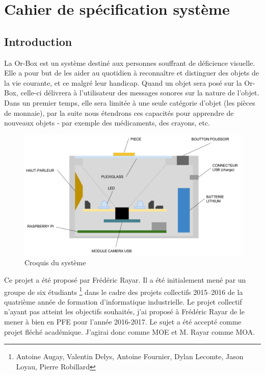 \chapter{Cahier de spécification système}

\section{Introduction}
\label{sec:intro}

La Or-Box est un système destiné aux personnes souffrant de déficience visuelle.
Elle a pour but de les aider au quotidien à reconnaître et distinguer des objets de la vie courante, et ce malgré leur handicap. Quand un objet sera posé sur la Or-Box, celle-ci délivrera à l’utilisateur des messages sonores sur la nature de l’objet.
Dans un premier temps, elle sera limitée à une seule catégorie d’objet (les pièces de monnaie), par la suite nous étendrons ces capacités pour apprendre de nouveaux objets - par exemple des médicaments, des crayons, etc.

\begin{figure}[ht]
  \centerline{
	\includegraphics[width=12cm]{img/InitialSketch.png}
  }
  \caption{Croquis du système}
  \label{croquis}
\end{figure}
	
Ce projet a été proposé par Frédéric Rayar.
Il a été initialement mené par un groupe de six étudiants \footnote{Antoine Augay, Valentin Delys, Antoine Fournier, Dylan Lecomte, Jason Loyau, Pierre Robillard} dans le cadre des projets collectifs 2015--2016 de la quatrième année de formation d'informatique industrielle.
Le projet collectif n'ayant pas atteint les objectifs souhaités, j'ai proposé à Frédéric Rayar de le mener à bien en PFE pour l'année 2016-2017.
Le sujet a été accepté comme projet fléché académique.
J'agirai donc comme MOE et M. Rayar comme MOA.

